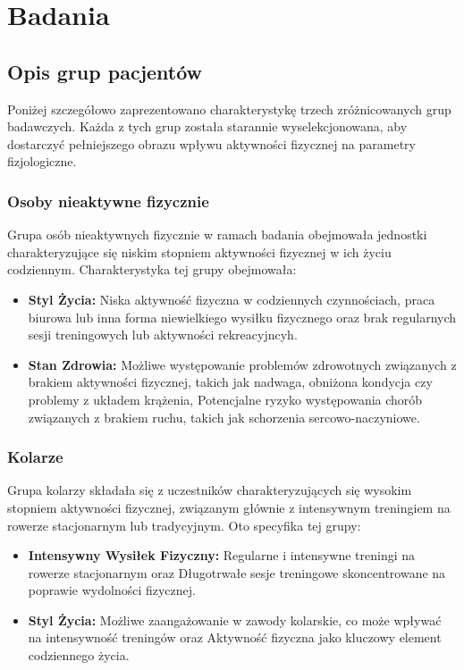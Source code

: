 \chapter{Badania}
\section{Opis grup pacjentów}
Poniżej szczegółowo zaprezentowano charakterystykę trzech zróżnicowanych grup badawczych. Każda z tych grup została starannie wyselekcjonowana, aby dostarczyć pełniejszego obrazu wpływu aktywności fizycznej na parametry fizjologiczne.
\subsection{Osoby nieaktywne fizycznie}
Grupa osób nieaktywnych fizycznie w ramach badania obejmowała jednostki charakteryzujące się niskim stopniem aktywności fizycznej w ich życiu codziennym. Charakterystyka tej grupy obejmowała:
\begin{itemize}
    \item \textbf{Styl Życia: } Niska aktywność fizyczna w codziennych czynnościach, praca biurowa lub inna forma niewielkiego wysiłku fizycznego oraz brak regularnych sesji treningowych lub aktywności rekreacyjncyh.
    \item \textbf{Stan Zdrowia: } Możliwe występowanie problemów zdrowotnych związanych z brakiem aktywności fizycznej, takich jak nadwaga, obniżona kondycja czy problemy z układem krążenia, Potencjalne ryzyko występowania chorób związanych z brakiem ruchu, takich jak schorzenia sercowo-naczyniowe.
\end{itemize}
\subsection{Kolarze}
Grupa kolarzy składała się z uczestników charakteryzujących się wysokim stopniem aktywności fizycznej, związanym głównie z intensywnym treningiem na rowerze stacjonarnym lub tradycyjnym. Oto specyfika tej grupy:
\begin{itemize}
    \item \textbf{Intensywny Wysiłek Fizyczny: } Regularne i intensywne treningi na rowerze stacjonarnym oraz Długotrwałe sesje treningowe skoncentrowane na poprawie wydolności fizycznej.
    \item \textbf{Styl Życia: } Możliwe zaangażowanie w zawody kolarskie, co może wpływać na intensywność treningów oraz Aktywność fizyczna jako kluczowy element codziennego życia.
\end{itemize}
